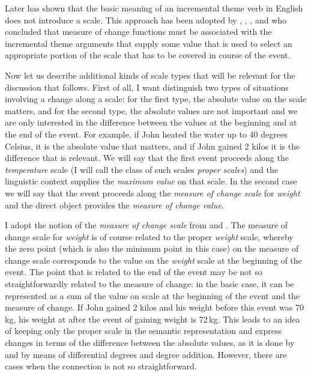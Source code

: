 Later \citet{Filip:05} has shown that the basic meaning of an incremental theme verb in English does not introduce a scale. This approach has been adopted by \citet{Rappaport:08}, \citet{LevinRappaport:10}, \citet{Kennedy:12}, and \citet{Bochnak:13} who concluded that measure of change functions must be associated with the incremental theme arguments that supply some value that is used to select an appropriate portion of the scale that has to be covered in course of the event. 

Now let us describe additional kinds of scale types that will be relevant for the discussion that follows. First of all, I want distinguish two types of situations involving a change along a scale: for the first type, the absolute value on the scale matters, and for the second type, the absolute values are not important and we are only interested in the difference between the values at the beginning and at the end of the event. For example, if John heated the water up to 40 degrees Celsius, it is the absolute value that matters, and if John gained 2 kilos it is the difference that is relevant. We will say that the first event proceeds along the \textit{temperature} scale (I will call the class of such scales \textit{proper scales}) and the linguistic context supplies the \textit{maximum value} on that scale. In the second case we will say that the event proceeds along the \textit{measure of change scale} for \textit{weight} and the direct object provides the \textit{measure of change value}. 

I adopt the notion of the \textit{measure of change scale} from \citet{KennedyLevin:08} and \citet{Kennedy:12}. The measure of change scale for \textit{weight} is of course related to the proper \textit{weight} scale, whereby the zero point (which is also the minimum point in this case) on the measure of change scale corresponds to the value on the \textit{weight} scale at the beginning of the event. The point that is related to the end of the event may be not so straightforwardly related to the measure of change: in the basic case, it can be represented as a sum of the value on scale at the beginning of the event and the measure of change. If John gained 2 kilos and his weight before this event was 70\,kg, his weight at after the event of gaining weight is 72\,kg. This leads to an idea of keeping only the proper scale in the semantic representation and express changes in terms of the difference between the absolute values, as it is done by \citealt{Kennedy:01} and \citealt{KennedyLevin:02} by means of differential degrees and degree addition. However, there are cases when the connection is not so straightforward.

